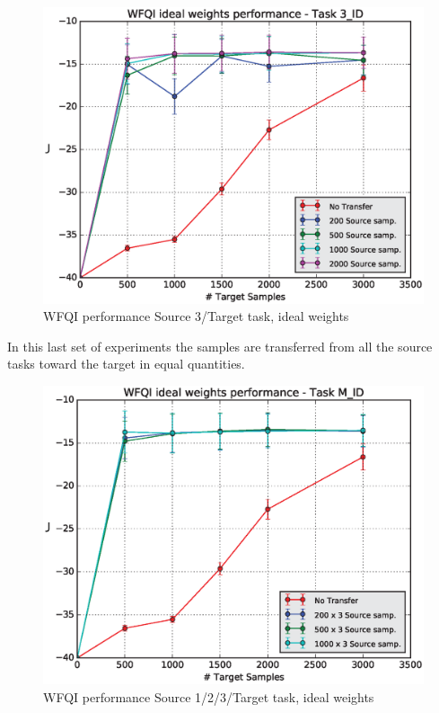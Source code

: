     \begin{figure}[H]
      \centering
      \includegraphics[scale=0.5]{images/WFQIPerf3_ID.eps}
      \caption{WFQI performance Source 3/Target task, ideal weights}
      \label{perf3ID}
    \end{figure}

    \noindent In this last set of experiments the samples are transferred from all
    the source tasks toward the target in equal quantities.

    \begin{figure}[H]
      \centering
      \includegraphics[scale=0.5]{images/WFQIPerfM_ID.eps}
      \caption{WFQI performance Source 1/2/3/Target task, ideal weights}
      \label{perfMID}
    \end{figure}

